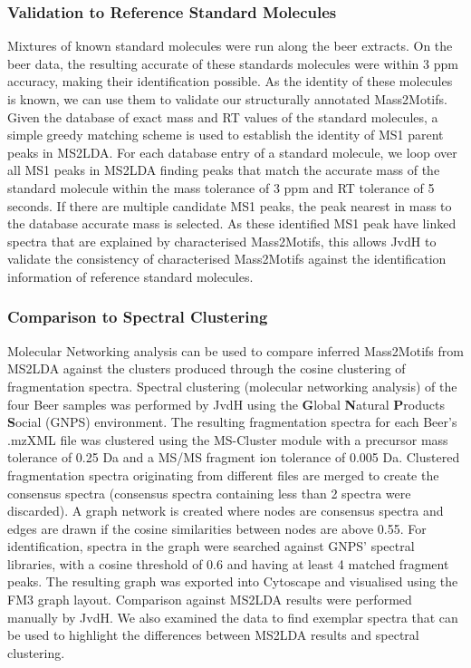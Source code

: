 \subsubsection{Validation to Reference Standard Molecules}

Mixtures of known standard molecules were run along the beer extracts. On the beer data, the resulting accurate of these standards molecules were within 3 ppm accuracy, making their identification possible. As the identity of these molecules is known, we can use them to validate our structurally annotated Mass2Motifs. Given the database of exact mass and RT values of the standard molecules, a simple greedy matching scheme is used to establish the identity of MS1 parent peaks in MS2LDA. For each database entry of a standard molecule, we loop over all MS1 peaks in MS2LDA finding peaks that match the accurate mass of the standard molecule within the mass tolerance of 3 ppm and RT tolerance of 5 seconds. If there are multiple candidate MS1 peaks, the peak nearest in mass to the database accurate mass is selected. As these identified MS1 peak have linked spectra that are explained by characterised Mass2Motifs, this allows JvdH to validate the consistency of characterised Mass2Motifs against the identification information of reference standard molecules.

\subsubsection{Comparison to Spectral Clustering}

Molecular Networking \cite{yang2013molecular, nguyen2013ms, van2016urinary} analysis can be used to compare inferred Mass2Motifs from MS2LDA against the clusters produced through the cosine clustering of fragmentation spectra. Spectral clustering (molecular networking analysis) of the four Beer samples was performed by JvdH using the \textbf{G}lobal \textbf{N}atural \textbf{P}roducts \textbf{S}ocial (GNPS) environment. The resulting fragmentation spectra for each Beer's .mzXML file was clustered using the MS-Cluster module with a precursor mass tolerance of 0.25 Da and a MS/MS fragment ion tolerance of 0.005 Da. Clustered fragmentation spectra originating from different files are merged to create the consensus spectra (consensus spectra containing less than 2 spectra were discarded). A graph network is created where nodes are consensus spectra and edges are drawn if the cosine similarities between nodes are above 0.55. For identification, spectra in the graph were searched against GNPS' spectral libraries, with a cosine threshold of 0.6 and having at least 4 matched fragment peaks. The resulting graph was exported into Cytoscape and visualised using the FM3 graph layout. Comparison against MS2LDA results were performed manually by JvdH. We also examined the data to find exemplar spectra that can be used to highlight the differences between MS2LDA results and spectral clustering.


